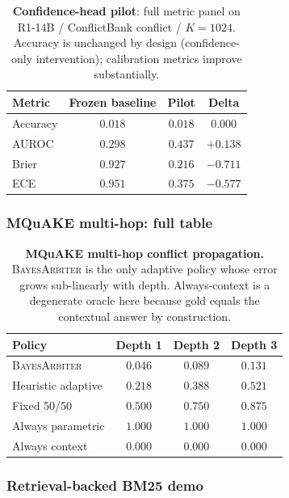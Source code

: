\begin{table}[H]
\centering
\small
\caption{\textbf{Confidence-head pilot}: full metric panel on R1-14B /
ConflictBank conflict / $K{=}1024$.  Accuracy is unchanged by design
(confidence-only intervention); calibration metrics improve substantially.}
\label{tab:confidence-head-app}
\begin{tabular}{lccc}
\toprule
\textbf{Metric} & \textbf{Frozen baseline} & \textbf{Pilot} & \textbf{Delta}\\
\midrule
Accuracy & $0.018$ & $0.018$ & $0.000$\\
AUROC    & $0.298$ & $0.437$ & $+0.138$\\
Brier    & $0.927$ & $0.216$ & $-0.711$\\
ECE      & $0.951$ & $0.375$ & $-0.577$\\
\bottomrule
\end{tabular}
\end{table}

\subsubsection{MQuAKE multi-hop: full table}

\begin{table}[H]
\centering
\small
\caption{\textbf{MQuAKE multi-hop conflict propagation.}  \textsc{BayesArbiter} is the
only adaptive policy whose error grows sub-linearly with depth.  Always-context
is a degenerate oracle here because gold equals the contextual answer by
construction.}
\label{tab:mquake-app}
\begin{tabular}{lccc}
\toprule
\textbf{Policy} & \textbf{Depth 1} & \textbf{Depth 2} & \textbf{Depth 3}\\
\midrule
\textsc{BayesArbiter} & $0.046$ & $0.089$ & $0.131$\\
Heuristic adaptive & $0.218$ & $0.388$ & $0.521$\\
Fixed 50/50        & $0.500$ & $0.750$ & $0.875$\\
Always parametric  & $1.000$ & $1.000$ & $1.000$\\
Always context     & $0.000$ & $0.000$ & $0.000$\\
\bottomrule
\end{tabular}
\end{table}

\subsubsection{Retrieval-backed BM25 demo}

